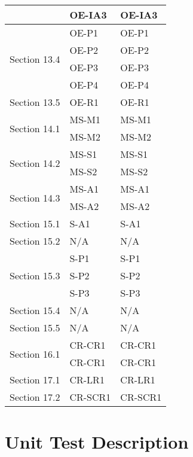 \documentclass[12pt, titlepage]{article}
\begin{document}
\begin{longtable}{|p{3cm}|p{4cm}|p{8cm}|}
  \cline{2-3}
  & OE-IA3 & OE-IA3 \\
  \hline
  \multirow{4}{3cm}{Section 13.4} 
  & OE-P1 & OE-P1 \\
  \cline{2-3}
  & OE-P2 & OE-P2 \\
  \cline{2-3}
  & OE-P3 & OE-P3 \\
  \cline{2-3}
  & OE-P4 & OE-P4 \\
  \hline
  \multirow{1}{3cm}{Section 13.5} 
  & OE-R1 & OE-R1 \\
  \hline
  \multirow{2}{3cm}{Section 14.1} 
  & MS-M1 & MS-M1 \\
  \cline{2-3}
  & MS-M2 & MS-M2 \\
  \hline
  \multirow{2}{3cm}{Section 14.2} 
  & MS-S1 & MS-S1 \\
  \cline{2-3}
  & MS-S2 & MS-S2 \\
  \hline
  \multirow{2}{3cm}{Section 14.3} 
  & MS-A1 & MS-A1 \\
  \cline{2-3}
  & MS-A2 & MS-A2 \\
  \hline
  \multirow{1}{3cm}{Section 15.1} 
  & S-A1 & S-A1 \\
  \hline
  \multirow{1}{3cm}{Section 15.2} 
  & N/A & N/A \\
  \hline
  \multirow{3}{3cm}{Section 15.3} 
  & S-P1 & S-P1 \\
  \cline{2-3}
  & S-P2 & S-P2 \\
  \cline{2-3}
  & S-P3 & S-P3 \\
  \hline
  \multirow{1}{3cm}{Section 15.4} 
  & N/A & N/A \\
  \hline
  \multirow{1}{3cm}{Section 15.5} 
  & N/A & N/A \\
  \hline
  \multirow{2}{3cm}{Section 16.1} 
  & CR-CR1 & CR-CR1 \\
  \cline{2-3}
  & CR-CR1 & CR-CR1 \\
  \hline
  \multirow{1}{3cm}{Section 17.1} 
  & CR-LR1 & CR-LR1 \\
  \hline
  \multirow{1}{3cm}{Section 17.2} 
  & CR-SCR1 & CR-SCR1 \\
  \hline
\end{longtable}
\pagebreak

\section{Unit Test Description}

\end{document}
